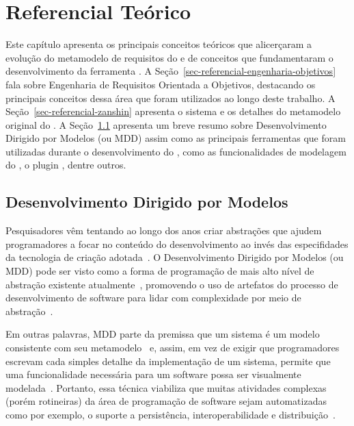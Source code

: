 \chapter{Referencial Teórico}
\label{sec-referencial}

Este capítulo apresenta os principais conceitos teóricos que alicerçaram a evolução do metamodelo de requisitos do \zanshin e de conceitos que fundamentaram o desenvolvimento da ferramenta \unagi. A Seção~\ref{sec-referencial-engenharia-objetivos} fala sobre Engenharia de Requisitos Orientada a Objetivos, destacando os principais conceitos dessa área que foram utilizados ao longo deste trabalho. A Seção~\ref{sec-referencial-zanshin} apresenta o sistema \zanshin e os detalhes do metamodelo original do \framework. A Seção~\ref{referencial-mdd} apresenta um breve resumo sobre Desenvolvimento Dirigido por Modelos (\mdd ou MDD) assim como  as principais ferramentas que foram utilizadas durante o desenvolvimento do \unagi, como as funcionalidades \emf de modelagem do \eclipse, o plugin \sirius, dentre outros.

\section{Desenvolvimento Dirigido por Modelos}
\label{referencial-mdd}
Pesquisadores vêm tentando ao longo dos anos criar abstrações que ajudem programadores a focar no conteúdo do desenvolvimento ao invés das especifidades da tecnologia de criação adotada~\cite{viyovic2014sirius}. O Desenvolvimento Dirigido por Modelos (\mdd ou MDD) pode ser visto como a forma de programação de mais alto nível de abstração existente atualmente~\cite{atkinson2003model}, promovendo o uso de artefatos do processo de desenvolvimento de software para lidar com complexidade por meio de abstração~\cite{viyovic2014sirius}.

Em outras palavras, MDD parte da premissa que um sistema é um modelo consistente com seu metamodelo~\cite{vujovic2014comparative} e, assim, em vez de exigir que programadores escrevam cada simples detalhe da implementação de um sistema, permite que uma funcionalidade necessária para um software possa ser visualmente modelada~\cite{atkinson2003model}. Portanto, essa técnica viabiliza que muitas atividades complexas (porém rotineiras) da área de programação de software sejam automatizadas como por exemplo, o suporte a persistência, interoperabilidade e distribuição~\cite{atkinson2003model}.

